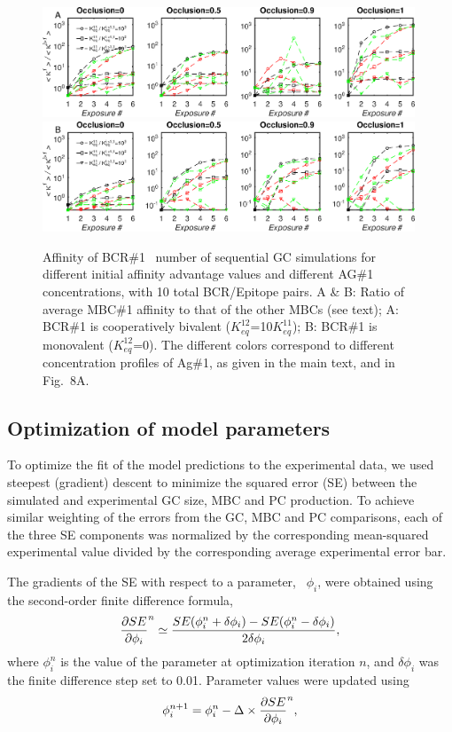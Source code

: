 \begin{figure}
\centering
\includegraphics[width=0.99\textwidth]{../fig8-S3-S8/afftime-k12=10.eps}
\includegraphics[width=0.99\textwidth]{../fig8-S3-S8/afftime-k12=0.eps}
\caption{Affinity of BCR\#1 \vs~number of sequential GC simulations for different initial affinity advantage values
and different AG\#1 concentrations, with 10 total BCR/Epitope pairs.
A \& B: Ratio of average MBC\#1 affinity to that of the other MBCs (see text);
A: BCR\#1 is cooperatively bivalent ($K^{12}_{eq}$=10$K^{11}_{eq}$);
B: BCR\#1 is monovalent ($K^{12}_{eq}$=0). The different colors correspond to different concentration profiles of Ag\#1, as given in the main text, and in 
Fig.~8A.
}
\label{fig:agtime2}
\end{figure}

\vspace{2.5EM}
\subsection{Optimization of model parameters}
\label{sec:optim}
To optimize the fit of the model predictions to the experimental
data,\cite{wittenbrink11,weisel16} we used steepest (gradient) descent to
minimize the squared error (SE) between the simulated and
experimental GC size, MBC and PC production. To achieve similar weighting of the
errors from the GC, MBC and PC comparisons, each of the three SE components
was normalized by the corresponding mean-squared experimental value divided by the corresponding average experimental error bar.

The gradients of the SE with respect to a parameter, \eg~$\phi_i$, were obtained using the second-order finite difference formula,\ie
\begin{equation}
 \frac{\partial {SE}}{\partial {\phi_i}}^n \simeq \frac{SE(\phi^n_i+\delta\phi_i) - SE(\phi^n_i-\delta\phi_i)}{2\delta\phi_i},
 \label{eq:grad}
\end{equation}
where $\phi^n_i$ is the value of the parameter at optimization iteration $n$,
and $\delta\phi_i$ was the finite difference step set to 0.01.
Parameter values were updated using
\begin{equation}
 \phi^{n+1}_i = \phi^n_i - \Delta \times \frac{\partial {SE}}{\partial {\phi_i}}^n,
 \label{eq:update}
\end{equation}

